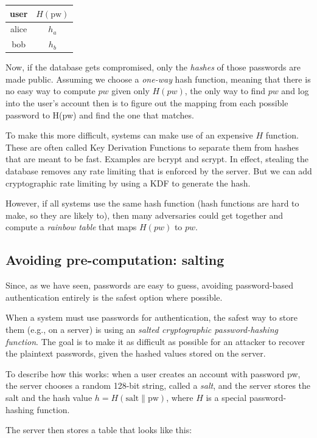 \begin{tabular}{c|c}
  user & $H(\text{pw})$ \\
	\hline
	alice & $h_a$ \\
	bob & $h_b$ \\
\end{tabular}

Now, if the database gets compromised, only the \textit{hashes} of those passwords are made public. Assuming we choose a \textit{one-way} hash function, meaning that there is no easy way to compute $pw$ given only $H(pw)$, the only way to find $pw$ and log into the user's account then is to figure out the mapping from each possible password to H(pw) and find the one that matches. 

To make this more difficult, systems can make use of an expensive $H$ function. These are often called Key Derivation Functions to separate them from hashes that are meant to be fast. Examples are bcrypt and scrypt. In effect, stealing the database removes any rate limiting that is enforced by the server. But we can add cryptographic rate limiting by using a KDF to generate the hash.

However, if all systems use the same hash function (hash functions are hard to make, so they are likely to), then many adversaries could get together and compute a \textit{rainbow table} that maps $H(pw)$ to $pw$. 

\subsection{Avoiding pre-computation: salting}
\fi

Since, as we have seen, passwords are easy to guess, avoiding 
password-based authentication entirely is the safest option where
possible.

When a system must use passwords for authentication, the safest
way to store them (e.g., on a server) is using an 
\emph{salted cryptographic password-hashing function}.
The goal is to make it as difficult as possible for an attacker
to recover the plaintext passwords, given the hashed values stored on the server.

To describe how this works: when a user creates an account with password pw,
the server chooses a random 128-bit string, called a \emph{salt},
and the server stores the salt and the hash value
$h=H(\text{salt}\|\text{pw})$, where $H$ is a special password-hashing function.

The server then stores a table that looks like this:

